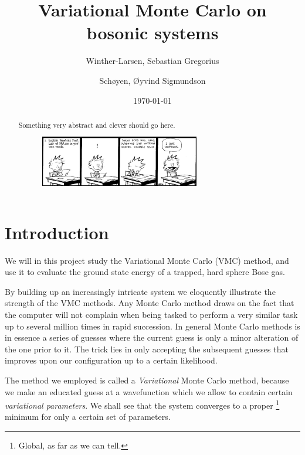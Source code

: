 \documentclass[
    a4paper, aps, twocolumn, floatfix, superscriptaddress, nofootinbib]{revtex4-1}
\newcommand{\1}{\mathds{1}}
\begin{document}
\title{Variational Monte Carlo on bosonic systems}
\author{Winther-Larsen, Sebastian Gregorius}
\author{Schøyen, Øyvind Sigmundson}
\date{\today}

\begin{abstract}
    Something very abstract and clever should go here.
    \begin{figure}[h!]
        \centering
        \includegraphics[width=0.7\textwidth]{loopholes.jpg}
    \end{figure}
\end{abstract}

\maketitle
\tableofcontents



\section{Introduction}
    We will in this project study the Variational Monte Carlo (VMC) method, and
    use it to evaluate the ground state energy of a trapped, hard sphere Bose
    gas. \cite{dubois2001bose} \cite{nilsen2005vortices}

    By building up an increasingly intricate system we eloquently illustrate the
    strength of the VMC methods. Any Monte Carlo method draws on the fact that
    the computer will not complain when being tasked to perform a very similar
    task up to several million times in rapid succession. In general Monte Carlo
    methods is in essence a series of guesses where the current guess is only a minor
    alteration of the one prior to it. The trick lies in only accepting the subsequent
    guesses that improves upon our configuration up to a certain likelihood.

    The method we employed is called a \emph{Variational} Monte Carlo method,
    because we make an educated guess at a wavefunction which we allow to contain
    certain \emph{variational parameters}. We shall see that the system converges to a proper
    \footnote{Global, as far as we can tell.} minimum for only a certain set of parameters.
\end{document}
